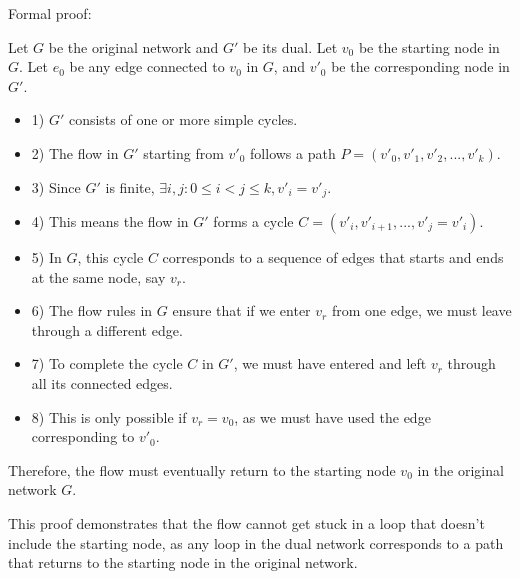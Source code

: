 \documentclass{article}
\begin{document}
Formal proof:

Let $G$ be the original network and $G'$ be its dual.
Let $v_0$ be the starting node in $G$.
Let $e_0$ be any edge connected to $v_0$ in $G$, and $v'_0$ be the corresponding node in $G'$.

\begin{itemize}
    \item 1) $G'$ consists of one or more simple cycles.
    \item 2) The flow in $G'$ starting from $v'_0$ follows a path $P = (v'_0, v'_1, v'_2, ..., v'_k)$.
    \item 3) Since $G'$ is finite, $\exists i,j : 0 \leq i < j \leq k, v'_i = v'_j$.
    \item 4) This means the flow in $G'$ forms a cycle $C = (v'_i, v'_{i+1}, ..., v'_j = v'_i)$.
    \item 5) In $G$, this cycle $C$ corresponds to a sequence of edges that starts and ends at the same node, say $v_r$.
    \item 6) The flow rules in $G$ ensure that if we enter $v_r$ from one edge, we must leave through a different edge.
    \item 7) To complete the cycle $C$ in $G'$, we must have entered and left $v_r$ through all its connected edges.
    \item 8) This is only possible if $v_r = v_0$, as we must have used the edge corresponding to $v'_0$.
\end{itemize}

Therefore, the flow must eventually return to the starting node $v_0$ in the original network $G$.

This proof demonstrates that the flow cannot get stuck in a loop that doesn't include the starting node, as any loop in the dual network corresponds to a path that returns to the starting node in the original network.
\end{document}
